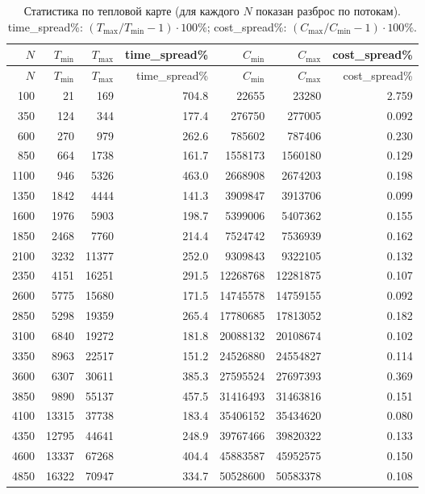 \documentclass[a4paper,12pt]{article}
\begin{document}
\begin{longtable}{r r r r r r r}
\caption{Статистика по тепловой карте (для каждого $N$ показан разброс по потокам). 
time\_spread\%: $(T_{\max}/T_{\min}-1)\cdot 100\%$;
cost\_spread\%: $(C_{\max}/C_{\min}-1)\cdot 100\%$.}
\label{tab:heatmap-stats}
\\
\toprule
$N$ & $T_{\min}$ & $T_{\max}$ & time\_spread\% & $C_{\min}$ & $C_{\max}$ & cost\_spread\% \\
\midrule
\endfirsthead
\toprule
$N$ & $T_{\min}$ & $T_{\max}$ & time\_spread\% & $C_{\min}$ & $C_{\max}$ & cost\_spread\% \\
\midrule
\endhead
100  & 21  & 169  & 704.8 & 22655   & 23280   & 2.759 \\
350  & 124 & 344  & 177.4 & 276750  & 277005  & 0.092 \\
600  & 270 & 979  & 262.6 & 785602  & 787406  & 0.230 \\
850  & 664 & 1738 & 161.7 & 1558173 & 1560180 & 0.129 \\
1100 & 946 & 5326 & 463.0 & 2668908 & 2674203 & 0.198 \\
1350 & 1842 & 4444 & 141.3 & 3909847 & 3913706 & 0.099 \\
1600 & 1976 & 5903 & 198.7 & 5399006 & 5407362 & 0.155 \\
1850 & 2468 & 7760 & 214.4 & 7524742 & 7536939 & 0.162 \\
2100 & 3232 & 11377 & 252.0 & 9309843 & 9322105 & 0.132 \\
2350 & 4151 & 16251 & 291.5 & 12268768 & 12281875 & 0.107 \\
2600 & 5775 & 15680 & 171.5 & 14745578 & 14759155 & 0.092 \\
2850 & 5298 & 19359 & 265.4 & 17780685 & 17813052 & 0.182 \\
3100 & 6840 & 19272 & 181.8 & 20088132 & 20108674 & 0.102 \\
3350 & 8963 & 22517 & 151.2 & 24526880 & 24554827 & 0.114 \\
3600 & 6307 & 30611 & 385.3 & 27595524 & 27697393 & 0.369 \\
3850 & 9890 & 55137 & 457.5 & 31416493 & 31463816 & 0.151 \\
4100 & 13315 & 37738 & 183.4 & 35406152 & 35434620 & 0.080 \\
4350 & 12795 & 44641 & 248.9 & 39767466 & 39820322 & 0.133 \\
4600 & 13337 & 67268 & 404.4 & 45883587 & 45952575 & 0.150 \\
4850 & 16322 & 70947 & 334.7 & 50528600 & 50583378 & 0.108 \\
\bottomrule
\end{longtable}
\end{document}
